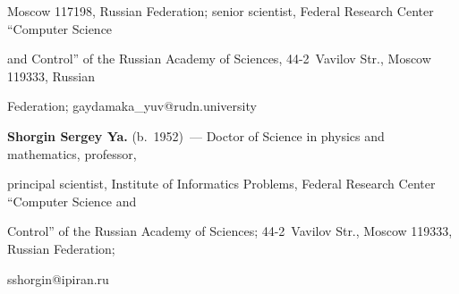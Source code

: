 Moscow 117198, Russian Federation; senior scientist, Federal Research Center ``Computer Science 


and Control'' of the Russian Academy of Sciences, 44-2~Vavilov Str., Moscow 119333, Russian 


Federation; \mbox{gaydamaka\_yuv@rudn.university}


\vspace*{3pt}





\noindent


\textbf{Shorgin Sergey Ya.} (b.\ 1952)~--- Doctor of Science in physics and mathematics, professor, 


principal scientist, Institute of Informatics Problems, Federal Research Center ``Computer Science and 


Control'' of the Russian Academy of Sciences; 44-2~Vavilov Str., Moscow 119333, Russian Federation; 


\mbox{sshorgin@ipiran.ru}


\label{end\stat}








\renewcommand{\bibname}{\protect\rm Литература}


